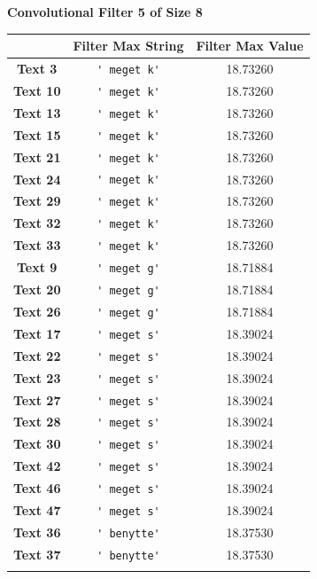 \begin{table}
    \centering
    \textbf{Convolutional Filter 5 of Size 8}\par\medskip
    \begin{tabular}{c|cc}
        & \textbf{Filter Max String} & \textbf{Filter Max Value} \\ \hline
        \textbf{Text 3} & \verb{' meget k'{ & 18.73260 \\
        \textbf{Text 10} & \verb{' meget k'{ & 18.73260 \\
        \textbf{Text 13} & \verb{' meget k'{ & 18.73260 \\
        \textbf{Text 15} & \verb{' meget k'{ & 18.73260 \\
        \textbf{Text 21} & \verb{' meget k'{ & 18.73260 \\
        \textbf{Text 24} & \verb{' meget k'{ & 18.73260 \\
        \textbf{Text 29} & \verb{' meget k'{ & 18.73260 \\
        \textbf{Text 32} & \verb{' meget k'{ & 18.73260 \\
        \textbf{Text 33} & \verb{' meget k'{ & 18.73260 \\
        \textbf{Text 9} & \verb{' meget g'{ & 18.71884 \\
        \textbf{Text 20} & \verb{' meget g'{ & 18.71884 \\
        \textbf{Text 26} & \verb{' meget g'{ & 18.71884 \\
        \textbf{Text 17} & \verb{' meget s'{ & 18.39024 \\
        \textbf{Text 22} & \verb{' meget s'{ & 18.39024 \\
        \textbf{Text 23} & \verb{' meget s'{ & 18.39024 \\
        \textbf{Text 27} & \verb{' meget s'{ & 18.39024 \\
        \textbf{Text 28} & \verb{' meget s'{ & 18.39024 \\
        \textbf{Text 30} & \verb{' meget s'{ & 18.39024 \\
        \textbf{Text 42} & \verb{' meget s'{ & 18.39024 \\
        \textbf{Text 46} & \verb{' meget s'{ & 18.39024 \\
        \textbf{Text 47} & \verb{' meget s'{ & 18.39024 \\
        \textbf{Text 36} & \verb{' benytte'{ & 18.37530 \\
        \textbf{Text 37} & \verb{' benytte'{ & 18.37530 \\
}}}}}}}}}}}}}}}}}}}}}}}
\end{tabular}
\end{table}
